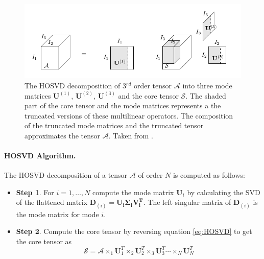 \documentclass[11pt,a4paper,twoside]{report}
\begin{document}
\begin{figure}[H]
\centering
\includegraphics[scale=0.94]{images/n_mode_svd2.png}
\caption{The HOSVD decomposition of 3$^{rd}$ order tensor $\mathcal{A}$ into
  three mode matrices $\mathbf{U}^{(1)}$, $\mathbf{U}^{(2)}$, $\mathbf{U}^{(3)}$
  and the core tensor $\mathcal{S}$. The shaded part of the core tensor and the
  mode matrices represents a the truncated versions of these multilinear
  operators. The composition of the truncated mode matrices and the truncated
  tensor approximates the tensor $\mathcal{A}$. Taken from \cite{multilinear}. }
\label{fg:hosvd}
\end{figure}

\paragraph{HOSVD Algorithm.} The HOSVD decomposition of a tensor $\mathcal{A}$
of order $N$ is computed as follows:
\begin{itemize}
\item \textbf{Step 1}. For $i=1,\ldots,N$ compute the mode matrix $\mathbf{U}_i$
  by calculating the SVD of the flattened matrix $\mathbf{D}_{(i)} = \mathbf{U_i
    \Sigma_i V_i^T}$. The left singular matrix of $\mathbf{D}_{(i)}$ is the mode
  matrix for mode $i$.
\item  \textbf{Step 2}. Compute the core tensor by reversing equation
  \ref{eq:HOSVD} to get the core tensor as 
\begin{equation}\label{eq:core}
\mathcal{S} = \mathcal{A} \times_1 \mathbf{U}_1^T \times_2
\mathbf{U}_2^T \times_3 \mathbf{U}_3^T \dotsb \times_N \mathbf{U}_N^T
\end{equation}
\end{itemize}
\end{document}
